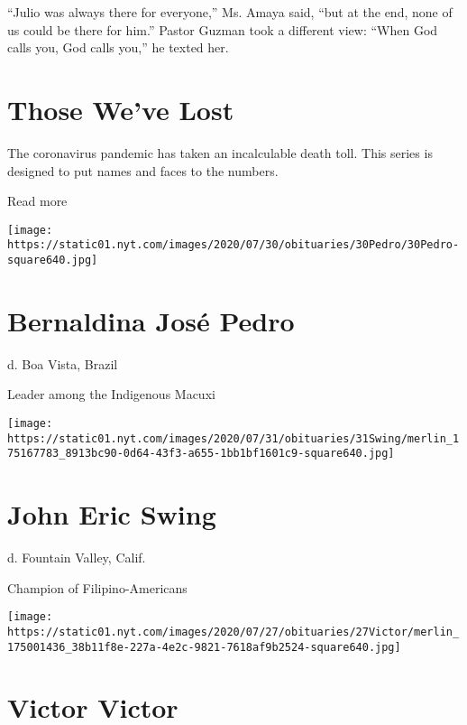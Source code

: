 ``Julio was always there for everyone,'' Ms. Amaya said, ``but at the
end, none of us could be there for him.'' Pastor Guzman took a different
view: ``When God calls you, God calls you,'' he texted her.

\href{https://www.nytimes.com/interactive/2020/obituaries/people-died-coronavirus-obituaries.html?action=click\&pgtype=Article\&state=default\&region=BELOW_MAIN_CONTENT\&context=covid_obits_promo}{}

\hypertarget{those-weve-lost}{%
\section{Those We've Lost}\label{those-weve-lost}}

The coronavirus pandemic has taken an incalculable death toll. This
series is designed to put names and faces to the numbers.

Read more

\texttt{[image: https://static01.nyt.com/images/2020/07/30/obituaries/30Pedro/30Pedro-square640.jpg]}

\hypertarget{bernaldina-josuxe9-pedro}{%
\section{Bernaldina José Pedro}\label{bernaldina-josuxe9-pedro}}

d. Boa Vista, Brazil

Leader among the Indigenous Macuxi

\texttt{[image: https://static01.nyt.com/images/2020/07/31/obituaries/31Swing/merlin\_175167783\_8913bc90-0d64-43f3-a655-1bb1bf1601c9-square640.jpg]}

\hypertarget{john-eric-swing}{%
\section{John Eric Swing}\label{john-eric-swing}}

d. Fountain Valley, Calif.

Champion of Filipino-Americans

\texttt{[image: https://static01.nyt.com/images/2020/07/27/obituaries/27Victor/merlin\_175001436\_38b11f8e-227a-4e2c-9821-7618af9b2524-square640.jpg]}

\hypertarget{victor-victor}{%
\section{Victor Victor}\label{victor-victor}}

